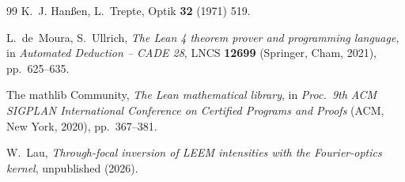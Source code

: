 \documentclass[11pt,a4paper]{article}
\theoremstyle{definition}
\theoremstyle{remark}
\begin{document}
\begin{thebibliography}{99}
K.~J. Han{\ss}en, L.~Trepte,
Optik \textbf{32} (1971) 519.

L.~de~Moura, S.~Ullrich,
\emph{The Lean 4 theorem prover and programming language},
in \emph{Automated Deduction -- CADE 28},
LNCS \textbf{12699} (Springer, Cham, 2021), pp.~625--635.

The mathlib Community,
\emph{The Lean mathematical library},
in \emph{Proc.\ 9th ACM SIGPLAN International Conference on
Certified Programs and Proofs} (ACM, New York, 2020), pp.~367--381.

W.~Lau,
\emph{Through-focal inversion of LEEM intensities with the
Fourier-optics kernel},
unpublished (2026).

\end{thebibliography}
\end{document}
